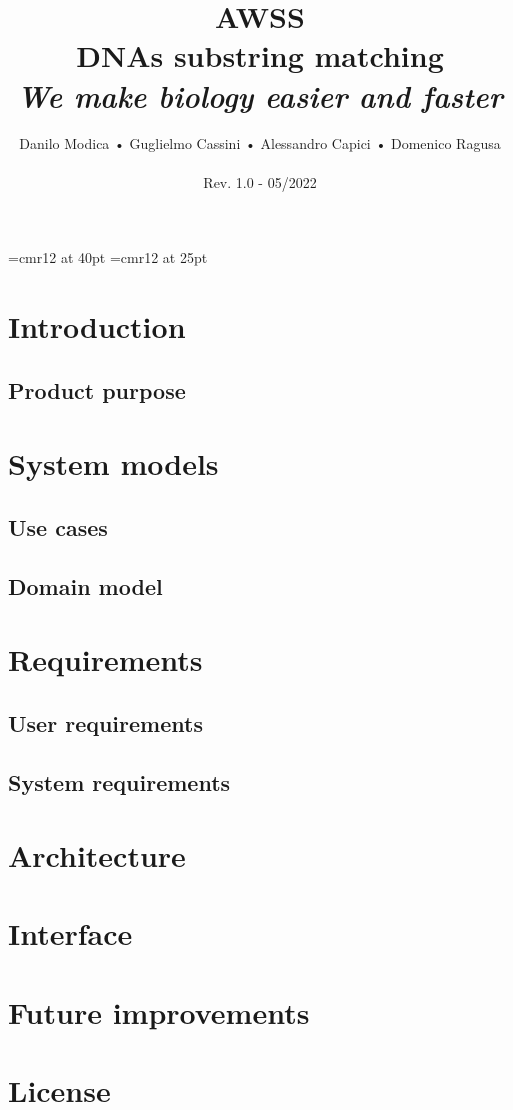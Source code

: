 \documentclass[a4paper,10pt, titlepage]{article}
\begin{document}
\font\myfont=cmr12 at 40pt
\font\myfontok=cmr12 at 25pt

\title{%
  \textbf{\myfont AWSS} \\
  \myfontok DNAs substring matching\\
  	\textit{We make biology easier and faster}}

\author{Danilo Modica • Guglielmo Cassini • Alessandro Capici • Domenico Ragusa\\
		\\
		\footnotesize Rev. 1.0 - 05/2022}
\date{}
\maketitle

\clearpage
\tableofcontents

\clearpage
\setcounter{page}{1}

\section{Introduction}
\subsection{Product purpose}
\section{System models}
\subsection{Use cases}
\subsection{Domain model}
\section{Requirements}
\subsection{User requirements}
\subsection{System requirements}
\section{Architecture}
\section{Interface}
\section{Future improvements}
\section{License}
\end{document}
